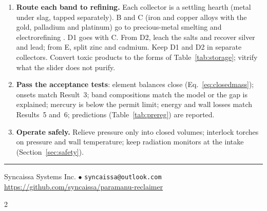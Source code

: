 \documentclass[11pt,a4paper]{article}
\theoremstyle{definition}
\theoremstyle{plain}
\theoremstyle{remark}
\begin{document}
{\begin{enumerate}[label=\textbf{A.\arabic*},leftmargin=2.6em,itemsep=2pt]
\item \textbf{Route each band to refining.} Each collector is a settling hearth (metal under slag, tapped separately). B and C (iron and copper alloys with the gold, palladium and platinum) go to precious-metal smelting and electrorefining \citep{cui2008}. D1 goes with C. From D2, leach the salts and recover silver and lead; from E, split zinc and cadmium. Keep D1 and D2 in separate collectors. Convert toxic products to the forms of Table~\ref{tab:storage}; vitrify what the slider does not purify.
\item \textbf{Pass the acceptance tests}: element balances close (Eq.~\ref{eq:closedmass}); onsets match Result~3; band compositions match the model or the gap is explained; mercury is below the permit limit; energy and wall losses match Results~5 and~6; predictions (Table~\ref{tab:prereg}) are reported.
\item \textbf{Operate safely.} Relieve pressure only into closed volumes; interlock torches on pressure and wall temperature; keep radiation monitors at the intake (Section~\ref{sec:safety}).
\end{enumerate}}

\renewenvironment{pclosing}{\par\vspace{4pt}\centering\rule{0.5\textwidth}{0.4pt}\par\vspace{2pt}\small}{\par}
\begin{pclosing}
Syncaissa Systems Inc. \quad $\bullet$ \quad \texttt{syncaissa@outlook.com}\\[2pt]
\url{https://github.com/syncaissa/paramanu-reclaimer}
\end{pclosing}

{\footnotesize\linespread{0.94}\selectfont

\setlength{\bibsep}{0pt}
\setlength{\columnsep}{14pt}
\begin{multicols}{2}

\end{multicols}
}
\end{document}
